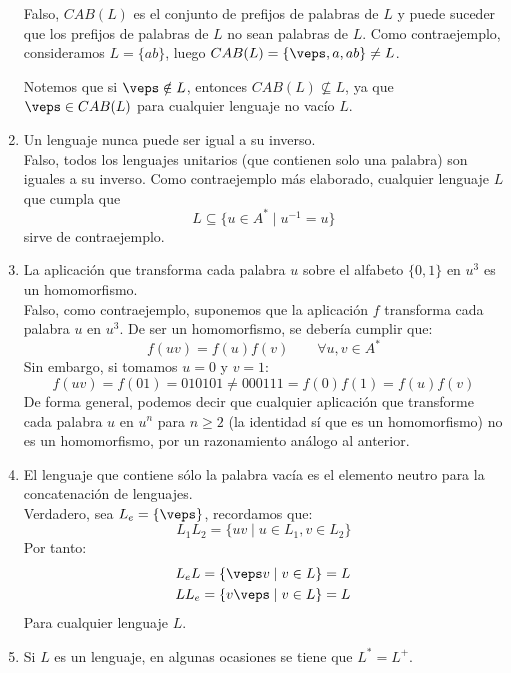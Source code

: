 \begin{enumerate}
        Falso, $CAB(L)$  es el conjunto de prefijos de palabras de $L$ y puede suceder que los prefijos de palabras de $L$ no sean palabras de $L$. Como contraejemplo, consideramos $L=\{ab\}$, luego $CAB(L) = \{\veps, a, ab\}\neq L$.

        Notemos que si $\veps \notin L$, entonces $CAB(L)\nsubseteq L$, ya que $\veps \in CAB(L)$ para cualquier lenguaje no vacío $L$.
    \item Un lenguaje nunca puede ser igual a su inverso.\\

        Falso, todos los lenguajes unitarios (que contienen solo una palabra) son iguales a su inverso. Como contraejemplo más elaborado, cualquier lenguaje $L$ que cumpla que
        \begin{equation*}
            L \subseteq \{u\in A^\ast \mid u^{-1} = u\}
        \end{equation*}
        sirve de contraejemplo.
    \item La aplicación que transforma cada palabra $u$ sobre el alfabeto $\{0,1\}$ en $u^3$ es un homomorfismo.\\

        Falso, como contraejemplo, suponemos que la aplicación $f$ transforma cada palabra $u$ en $u^3$. De ser un homomorfismo, se debería cumplir que:
        \begin{equation*}
            f(uv) = f(u)f(v) \qquad \forall u,v\in A^\ast
        \end{equation*}
        Sin embargo, si tomamos $u = 0$ y $v = 1$:
        \begin{equation*}
            f(uv) = f(01) = 010101 \neq 000111 = f(0)f(1) = f(u)f(v)
        \end{equation*}
        De forma general, podemos decir que cualquier aplicación que transforme cada palabra $u$ en $u^n$ para $n \geq 2$ (la identidad sí que es un homomorfismo) no es un homomorfismo, por un razonamiento análogo al anterior.
    \item El lenguaje que contiene sólo la palabra vacía es el elemento neutro para la concatenación de lenguajes.\\

        Verdadero, sea $L_e = \{\veps\}$, recordamos que:
        \begin{equation*}
            L_1L_2 = \{uv \mid u\in L_1, v\in L_2\}
        \end{equation*}
        Por tanto:
        \begin{gather*}
            L_e L = \{\veps v \mid v\in L\} = L \\
            L L_e = \{v\veps \mid v\in L\} = L
        \end{gather*}
        Para cualquier lenguaje $L$.
    \item Si $L$ es un lenguaje, en algunas ocasiones se tiene que $L^\ast = L^+$.\\


\end{enumerate}
